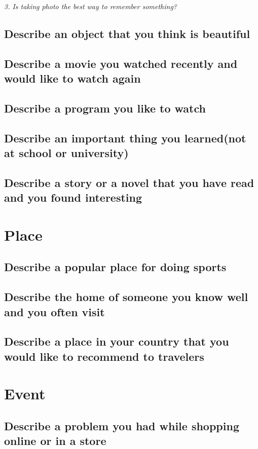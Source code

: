 \documentclass[conference]{IEEEtran}
\begin{document}
\textit{3. Is taking photo the best way to remember something?}

\subsection{Describe an object that you think is beautiful}
\subsection{Describe a movie you watched recently and would like to watch again}
\subsection{Describe a program you like to watch}
\subsection{Describe an important thing you learned(not at school or university)}
\subsection{Describe a story or a novel that you have read and you found interesting}


\section{Place}
\subsection{Describe a popular place for doing sports}
\subsection{Describe the home of someone you know well and you often visit}
\subsection{Describe a place in your country that you would like to recommend to
travelers}

\section{Event}
\subsection{Describe a problem you had while shopping online or in a store}
\end{document}
